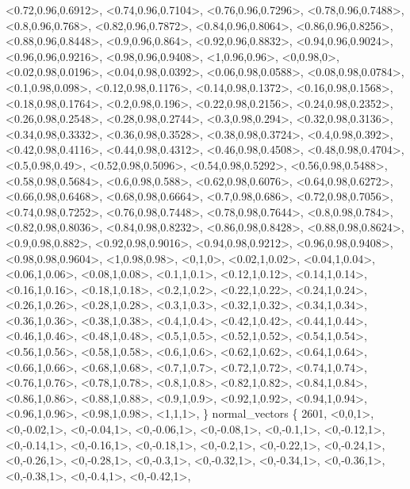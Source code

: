 \documentclass[a4paper,10pt]{article}
\begin{document}
\begin{eulernotebook}
\begin{euleroutput}
  <0.72,0.96,0.6912>,
  <0.74,0.96,0.7104>,
  <0.76,0.96,0.7296>,
  <0.78,0.96,0.7488>,
  <0.8,0.96,0.768>,
  <0.82,0.96,0.7872>,
  <0.84,0.96,0.8064>,
  <0.86,0.96,0.8256>,
  <0.88,0.96,0.8448>,
  <0.9,0.96,0.864>,
  <0.92,0.96,0.8832>,
  <0.94,0.96,0.9024>,
  <0.96,0.96,0.9216>,
  <0.98,0.96,0.9408>,
  <1,0.96,0.96>,
  <0,0.98,0>,
  <0.02,0.98,0.0196>,
  <0.04,0.98,0.0392>,
  <0.06,0.98,0.0588>,
  <0.08,0.98,0.0784>,
  <0.1,0.98,0.098>,
  <0.12,0.98,0.1176>,
  <0.14,0.98,0.1372>,
  <0.16,0.98,0.1568>,
  <0.18,0.98,0.1764>,
  <0.2,0.98,0.196>,
  <0.22,0.98,0.2156>,
  <0.24,0.98,0.2352>,
  <0.26,0.98,0.2548>,
  <0.28,0.98,0.2744>,
  <0.3,0.98,0.294>,
  <0.32,0.98,0.3136>,
  <0.34,0.98,0.3332>,
  <0.36,0.98,0.3528>,
  <0.38,0.98,0.3724>,
  <0.4,0.98,0.392>,
  <0.42,0.98,0.4116>,
  <0.44,0.98,0.4312>,
  <0.46,0.98,0.4508>,
  <0.48,0.98,0.4704>,
  <0.5,0.98,0.49>,
  <0.52,0.98,0.5096>,
  <0.54,0.98,0.5292>,
  <0.56,0.98,0.5488>,
  <0.58,0.98,0.5684>,
  <0.6,0.98,0.588>,
  <0.62,0.98,0.6076>,
  <0.64,0.98,0.6272>,
  <0.66,0.98,0.6468>,
  <0.68,0.98,0.6664>,
  <0.7,0.98,0.686>,
  <0.72,0.98,0.7056>,
  <0.74,0.98,0.7252>,
  <0.76,0.98,0.7448>,
  <0.78,0.98,0.7644>,
  <0.8,0.98,0.784>,
  <0.82,0.98,0.8036>,
  <0.84,0.98,0.8232>,
  <0.86,0.98,0.8428>,
  <0.88,0.98,0.8624>,
  <0.9,0.98,0.882>,
  <0.92,0.98,0.9016>,
  <0.94,0.98,0.9212>,
  <0.96,0.98,0.9408>,
  <0.98,0.98,0.9604>,
  <1,0.98,0.98>,
  <0,1,0>,
  <0.02,1,0.02>,
  <0.04,1,0.04>,
  <0.06,1,0.06>,
  <0.08,1,0.08>,
  <0.1,1,0.1>,
  <0.12,1,0.12>,
  <0.14,1,0.14>,
  <0.16,1,0.16>,
  <0.18,1,0.18>,
  <0.2,1,0.2>,
  <0.22,1,0.22>,
  <0.24,1,0.24>,
  <0.26,1,0.26>,
  <0.28,1,0.28>,
  <0.3,1,0.3>,
  <0.32,1,0.32>,
  <0.34,1,0.34>,
  <0.36,1,0.36>,
  <0.38,1,0.38>,
  <0.4,1,0.4>,
  <0.42,1,0.42>,
  <0.44,1,0.44>,
  <0.46,1,0.46>,
  <0.48,1,0.48>,
  <0.5,1,0.5>,
  <0.52,1,0.52>,
  <0.54,1,0.54>,
  <0.56,1,0.56>,
  <0.58,1,0.58>,
  <0.6,1,0.6>,
  <0.62,1,0.62>,
  <0.64,1,0.64>,
  <0.66,1,0.66>,
  <0.68,1,0.68>,
  <0.7,1,0.7>,
  <0.72,1,0.72>,
  <0.74,1,0.74>,
  <0.76,1,0.76>,
  <0.78,1,0.78>,
  <0.8,1,0.8>,
  <0.82,1,0.82>,
  <0.84,1,0.84>,
  <0.86,1,0.86>,
  <0.88,1,0.88>,
  <0.9,1,0.9>,
  <0.92,1,0.92>,
  <0.94,1,0.94>,
  <0.96,1,0.96>,
  <0.98,1,0.98>,
  <1,1,1>,
  \}
  normal_vectors \{ 2601,
  <0,0,1>,
  <0,-0.02,1>,
  <0,-0.04,1>,
  <0,-0.06,1>,
  <0,-0.08,1>,
  <0,-0.1,1>,
  <0,-0.12,1>,
  <0,-0.14,1>,
  <0,-0.16,1>,
  <0,-0.18,1>,
  <0,-0.2,1>,
  <0,-0.22,1>,
  <0,-0.24,1>,
  <0,-0.26,1>,
  <0,-0.28,1>,
  <0,-0.3,1>,
  <0,-0.32,1>,
  <0,-0.34,1>,
  <0,-0.36,1>,
  <0,-0.38,1>,
  <0,-0.4,1>,
  <0,-0.42,1>,

\end{euleroutput}
\end{eulernotebook}
\end{document}

